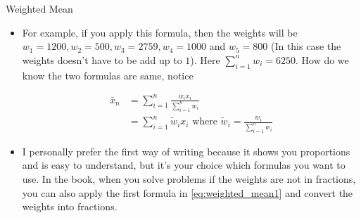 \documentclass[8pt, usepdftitle=false]{beamer}
\begin{document}
\begin{frame}[allowframebreaks]{Weighted Mean}
\begin{itemize}
\item[] For example, if you apply this formula, then the weights will be $w_1 = 1200, w_2 = 500, w_3 = 2759, w_4 = 1000$ and $w_5 = 800$ (In this case the weights doesn't have to be add up to $1$). Here $\sum_{i = 1}^{n}w_i = 6250$. How do we know the two formulas are same, notice

\begin{align}\label{eq:weighted_mean3}
  \bar{x}_n &=   \sum_{i = 1}^{n} \frac{w_i x_i}{\sum_{i = 1}^{n}w_i} \\
  & =  \sum_{i = 1}^{n} \tilde{w}_i x_i \text{ where }  \tilde{w}_i = \frac{w_i}{\sum_{i = 1}^{n}w_i}
\end{align}

\item[] I personally prefer the first way of writing because it shows you proportions and is easy to understand, but it's your choice which formulas you want to use. In the book, when you solve problems if the weights are not in fractions, you can also apply the first formula in \ref{eq:weighted_mean1} and convert the weights into fractions.

\end{itemize}
  
\end{frame}
\end{document}
